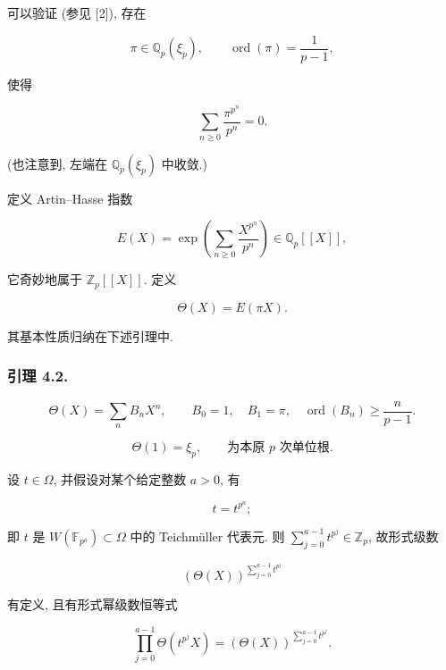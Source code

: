可以验证 (参见 [2]), 存在

\begin{equation}\tag{4.1.4}
\pi\in\mathbb Q_p(\xi_p),\qquad
\operatorname{ord}(\pi)=\frac1{p-1},
\end{equation}

使得

\begin{equation}\tag{4.1.5}
\sum_{n\geq0}\frac{\pi^{p^n}}{p^n}=0.
\end{equation}

(也注意到, 左端在 $\mathbb Q_p(\xi_p)$ 中收敛.)

定义 Artin--Hasse 指数

\begin{equation}\tag{4.1.6}
E(X)=\exp\!\left(\sum_{n\geq0}\frac{X^{p^n}}{p^n}\right)
\in\mathbb Q_p[[X]],
\end{equation}

它奇妙地属于 $\mathbb Z_p[[X]]$. 定义

\begin{equation}\tag{4.1.7}
\Theta(X)=E(\pi X).
\end{equation}

其基本性质归纳在下述引理中.

\subsubsection*{引理 4.2.}

\begin{equation}\tag{4.2.1}
\Theta(X)=\sum_n B_n X^n,\qquad B_0=1,\quad B_1=\pi,\quad
\operatorname{ord}(B_n)\geq\frac n{p-1}.
\end{equation}

\begin{equation}\tag{4.2.2}
\Theta(1)=\xi_p,\qquad\text{为本原 $p$ 次单位根.}
\end{equation}

设 $t\in\Omega$, 并假设对某个给定整数 $a>0$, 有

\begin{equation}\tag{4.2.3}
t=t^{p^a};
\end{equation}

即 $t$ 是 $W(\mathbb F_{p^a})\subset\Omega$ 中的 Teichmüller 代表元.
则 $\sum_{j=0}^{a-1}t^{p^j}\in\mathbb Z_p$, 故形式级数

\[
(\Theta(X))^{\sum_{j=0}^{a-1}t^{p^j}}
\]

有定义, 且有形式幂级数恒等式

\begin{equation}\tag{4.2.3.1}
\prod_{j=0}^{a-1}\Theta(t^{p^j}X)
=(\Theta(X))^{\sum_{j=0}^{a-1}t^{p^j}}.
\end{equation}
